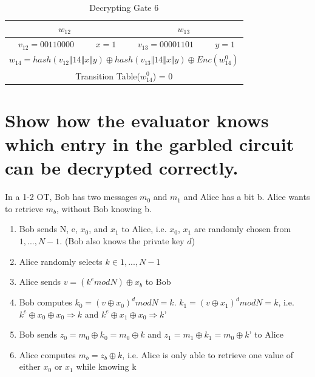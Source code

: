 \documentclass[times]{article}
\begin{document}
	\begin{table}
		\centering
		\caption{Decrypting Gate 6}
		\label{tab:DG6}
		\begin{tabular}{|c|c||c|c|}
			\hline
			\multicolumn{2}{|c||}{$w_{12}$} & \multicolumn{2}{|c|}{$w_{13}$} \\
			\hline
			$v_{12} = 00110000$ & $x = 1$ & $v_{13} = 00001101$ & $y = 1$ \\
			\hline
			\multicolumn{4}{|c||}{$w_{14} = hash(v_{12} \Vert 14 \Vert x \Vert y) \oplus hash(v_{13} \Vert 14 \Vert x \Vert y) \oplus Enc(w_{14}^0)$} \\
			\hline
			\multicolumn{4}{|c||}{Transition Table($w_{14}^0$) = 0} \\
			\hline
		\end{tabular}
	\end{table}
	
	\section{Show how the evaluator knows which entry in the garbled circuit can be decrypted correctly.}
	In a 1-2 OT, Bob has two messages $m_0$ and $m_1$ and Alice has a bit b. Alice wants to retrieve $m_b$, without Bob knowing b.

	\begin{enumerate}
  		\item Bob sends N, e, $x_0$, and $x_1$ to Alice, i.e. $x_0$, $x_1$ are randomly chosen from ${1, ..., N-1}$. (Bob also knows the private key $d$)
  		\item Alice randomly selects $k \in {1,...,N-1}$
  		\item Alice sends $v = (k^e mod N) \oplus x_b$ to Bob
  		\item Bob computes $k_0 = (v \oplus x_0)^d mod N = k$. $k_1 = (v \oplus x_1)^d mod N = k$, i.e. $k^e \oplus x_0 \oplus x_0 \Rightarrow k$ and $k^e \oplus x_1 \oplus x_0 \Rightarrow k’$
  		\item Bob sends  $z_0 = m_0 \oplus k_0 = m_0 \oplus k$ and $z_1 = m_1 \oplus k_1 = m_0 \oplus k’$ to Alice
  		\item Alice computes $m_b = z_b \oplus k$, i.e. Alice is only able to retrieve one value of either $x_0$ or $x_1$ while knowing k

	\end{enumerate}
\end{document}
